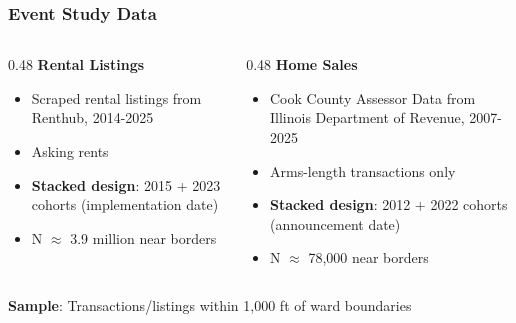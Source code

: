 \begin{frame}[label=event-data]
    \frametitle{Event Study Data}
    
    \begin{columns}[T]
    \begin{column}{0.48\textwidth}
    \textbf{Rental Listings}
    \begin{itemize}
        \item Scraped rental listings from Renthub, 2014-2025
        \item Asking rents
        \item \textbf{Stacked design}: 2015 + 2023 cohorts (implementation date)
        \item N $\approx$ 3.9 million near borders
    \end{itemize}
    \end{column}
    
    \begin{column}{0.48\textwidth}
    \textbf{Home Sales}
    \begin{itemize}
        \item Cook County Assessor Data from Illinois Department of Revenue, 2007-2025
        \item Arms-length transactions only
        \item \textbf{Stacked design}: 2012 + 2022 cohorts (announcement date)
        \item N $\approx$ 78,000 near borders
    \end{itemize}
    \end{column}
    \end{columns}
    
    \vspace{0.5em}
    \textbf{Sample}: Transactions/listings within 1,000 ft of ward boundaries
    
    \vfill\hfill
    \hyperlink{treatment-details}{}
\end{frame}


